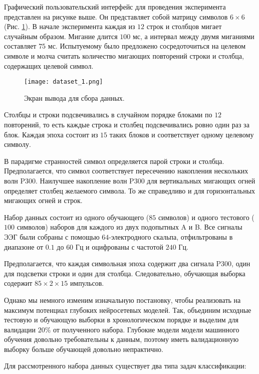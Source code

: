 \documentclass[12pt]{article}
\begin{document}
Графический пользовательский интерфейс для проведения эксперимента представлен на рисунке выше. Он представляет собой матрицу символов $6 \times 6$ (Рис. \ref{dataset_1}). В начале эксперимента каждая из $12$ строк и столбцов мигает случайным образом. Мигание длится $100$ мс, а интервал между двумя миганиями составляет $75$ мс. Испытуемому было предложено сосредоточиться на целевом символе и молча считать количество мигающих повторений строки и столбца, содержащих целевой символ. 

\begin{figure}[ht]
    \centering
    \texttt{[image: dataset\_1.png]}
    \caption{Экран вывода для сбора данных.}
    \label{dataset_1}
\end{figure}

Столбцы и строки подсвечивались в случайном порядке блоками по $12$ повторений, то есть каждые строка и столбец подсвечивались ровно один раз за блок. Каждая эпоха состоит из $15$ таких блоков и соответствует одному целевому символу.

В парадигме странностей символ определяется парой строки и столбца. Предполагается, что символ соответствует пересечению накопления нескольких волн P300. Наилучшее накопление волн P300 для вертикальных мигающих огней определяет столбец желаемого символа. То же справедливо и для горизонтальных мигающих огней и строк.

Набор данных состоит из одного обучающего ($85$ символов) и одного тестового ($100$ символов) наборов для каждого из двух подопытных A и B. Все сигналы ЭЭГ были собраны с помощью $64$-электродного скальпа, отфильтрованы в диапазоне от $0.1$ до $60$ Гц и оцифрованы с частотой $240$ Гц. 

Предполагается, что каждая символьная эпоха содержит два сигнала P300, один для подсветки строки и один для столбца. Следовательно, обучающая выборка содержит $85 \times 2 \times 15$ импульсов.

Однако мы немного изменим изначальную постановку, чтобы реализовать на максимум потенциал глубоких нейросетевых моделей. Так, объединим исходные тестовую и обучающую выборки в хронологическом порядке и выделим для валидации $20\%$ от полученного набора. Глубокие модели модели машинного обучения довольно требовательны к данным, поэтому иметь валидационную выборку больше обучающей довольно непрактично.

Для рассмотренного набора данных существует два типа задач классификации:
\end{document}
